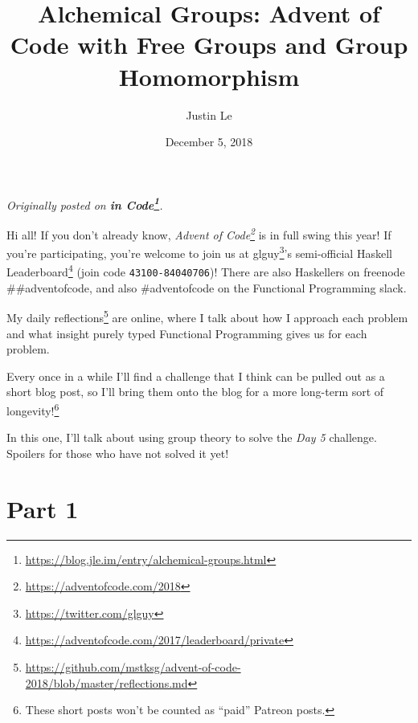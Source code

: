 \documentclass[]{article}
\title{Alchemical Groups: Advent of Code with Free Groups and Group Homomorphism}
\author{Justin Le}
\date{December 5, 2018}
\renewcommand{\href}[2]{#2\footnote{\url{#1}}}
\begin{document}
\maketitle

\emph{Originally posted on
\textbf{\href{https://blog.jle.im/entry/alchemical-groups.html}{in Code}}.}

Hi all! If you don't already know,
\emph{\href{https://adventofcode.com/2018}{Advent of Code}} is in full swing
this year! If you're participating, you're welcome to join us at
\href{https://twitter.com/glguy}{glguy}'s semi-official
\href{https://adventofcode.com/2017/leaderboard/private}{Haskell Leaderboard}
(join code \texttt{43100-84040706})! There are also Haskellers on freenode
\#\#adventofcode, and also \#adventofcode on the Functional Programming slack.

My
\href{https://github.com/mstksg/advent-of-code-2018/blob/master/reflections.md}{daily
reflections} are online, where I talk about how I approach each problem and what
insight purely typed Functional Programming gives us for each problem.

Every once in a while I'll find a challenge that I think can be pulled out as a
short blog post, so I'll bring them onto the blog for a more long-term sort of
longevity!\footnote{These short posts won't be counted as ``paid'' Patreon
  posts.}

In this one, I'll talk about using group theory to solve the \emph{Day 5}
challenge. Spoilers for those who have not solved it yet!

\hypertarget{part-1}{%
\section{Part 1}\label{part-1}}
\end{document}
